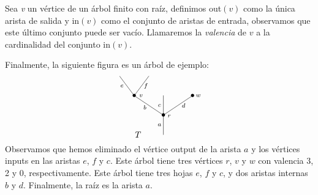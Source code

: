 \documentclass[11pt,a4paper,openright,oneside]{article}
\numberwithin{equation}{section}
\theoremstyle{definition}
\begin{document}
Sea \emph{v} un v\'ertice de un \'arbol finito con ra\'iz, definimos out$(v)$ como la \'unica arista de salida y in$(v)$ como el conjunto de aristas de entrada, observamos que este \'ultimo conjunto puede ser vac\'io.
Llamaremos la \emph{valencia} de $v$ a la cardinalidad del conjunto in$(v)$.

Finalmente, la siguiente figura es un \'arbol de ejemplo:
\begin{equation}
    \xy
    <0.08cm, 0cm>:
    (0.0, 0.0)*{}="1"; %
    (0.0, 10.0)*=0{\bullet}="2"; %
    (-15.0, 20.0)*=0{\bullet}="3"; %
    (-22.5, 30.0)*{}="4"; %
    (-7.5, 30.0)*{}="5"; %
    (0.0, 20.0)*{}="6"; %
    (15.0, 20.0)*=0{\bullet}="7"; %
    "1";"2" **\dir{-};
    "2";"3" **\dir{-};
    "3";"4" **\dir{-};
    "3";"5" **\dir{-};
    "2";"6" **\dir{-};
    "2";"7" **\dir{-};
    (3.0, 9.5)*=0{\scriptstyle r};
    (-11.5, 20.0)*=0{\scriptstyle v};
    (-2.0, 5.0)*=0{\scriptstyle a};
    (-9.5, 14.0)*=0{\scriptstyle b};
    (-21.3, 25.0)*=0{\scriptstyle e};
    (-9, 25.0)*=0{\scriptstyle f};
    (-2.0, 15.0)*=0{\scriptstyle c};
    (10.4, 15.0)*=0{\scriptstyle d};
    (18.0, 20.0)*=0{\scriptstyle w};
    (-13,0)*{T};
    \endxy
\end{equation}
Observamos que hemos eliminado el v\'ertice output de la arista $a$ y los v\'ertices inputs en las aristas $e$, $f$ y $c$. Este \'arbol tiene tres v\'ertices $r$, $v$ y $w$ con valencia 3, 2 y 0, respectivamente.
Este \'arbol tiene tres hojas $e$, $f$ y $c$, y dos aristas internas $b$ y $d$. Finalmente, la ra\'iz es la arista $a$.
\end{document}
